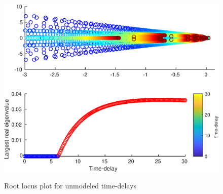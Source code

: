 \begin{figure}
    \includegraphics[width=\textwidth]{img/Fig_dump/tau_root_locusLQRDiffIntegralAgnostic_paramsair_diff.eps}
    \label{fig:LQR_root_locus_air_safe}
    \caption{Root locus plot for unmodeled time-delays}
\end{figure}


